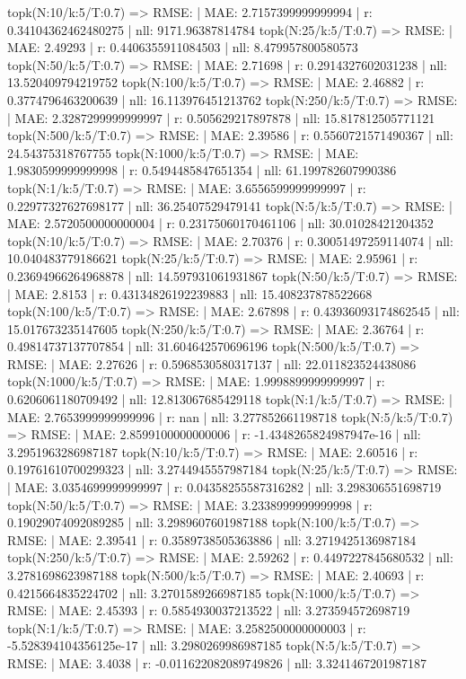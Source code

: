 topk(N:10/k:5/T:0.7) => RMSE: | MAE: 2.7157399999999994 | r: 0.34104362462480275 | nll: 9171.96387814784
topk(N:25/k:5/T:0.7) => RMSE: | MAE: 2.49293 | r: 0.4406355911084503 | nll: 8.479957800580573
topk(N:50/k:5/T:0.7) => RMSE: | MAE: 2.71698 | r: 0.2914327602031238 | nll: 13.520409794219752
topk(N:100/k:5/T:0.7) => RMSE: | MAE: 2.46882 | r: 0.3774796463200639 | nll: 16.113976451213762
topk(N:250/k:5/T:0.7) => RMSE: | MAE: 2.3287299999999997 | r: 0.505629217897878 | nll: 15.817812505771121
topk(N:500/k:5/T:0.7) => RMSE: | MAE: 2.39586 | r: 0.5560721571490367 | nll: 24.54375318767755
topk(N:1000/k:5/T:0.7) => RMSE: | MAE: 1.9830599999999998 | r: 0.5494485847651354 | nll: 61.199782607990386
topk(N:1/k:5/T:0.7) => RMSE: | MAE: 3.6556599999999997 | r: 0.22977327627698177 | nll: 36.25407529479141
topk(N:5/k:5/T:0.7) => RMSE: | MAE: 2.5720500000000004 | r: 0.23175060170461106 | nll: 30.01028421204352
topk(N:10/k:5/T:0.7) => RMSE: | MAE: 2.70376 | r: 0.30051497259114074 | nll: 10.040483779186621
topk(N:25/k:5/T:0.7) => RMSE: | MAE: 2.95961 | r: 0.23694966264968878 | nll: 14.597931061931867
topk(N:50/k:5/T:0.7) => RMSE: | MAE: 2.8153 | r: 0.43134826192239883 | nll: 15.408237878522668
topk(N:100/k:5/T:0.7) => RMSE: | MAE: 2.67898 | r: 0.43936093174862545 | nll: 15.017673235147605
topk(N:250/k:5/T:0.7) => RMSE: | MAE: 2.36764 | r: 0.49814737137707854 | nll: 31.604642570696196
topk(N:500/k:5/T:0.7) => RMSE: | MAE: 2.27626 | r: 0.5968530580317137 | nll: 22.011823524438086
topk(N:1000/k:5/T:0.7) => RMSE: | MAE: 1.9998899999999997 | r: 0.6206061180709492 | nll: 12.813067685429118
topk(N:1/k:5/T:0.7) => RMSE: | MAE: 2.7653999999999996 | r: nan | nll: 3.277852661198718
topk(N:5/k:5/T:0.7) => RMSE: | MAE: 2.8599100000000006 | r: -1.4348265824987947e-16 | nll: 3.2951963286987187
topk(N:10/k:5/T:0.7) => RMSE: | MAE: 2.60516 | r: 0.19761610700299323 | nll: 3.2744945557987184
topk(N:25/k:5/T:0.7) => RMSE: | MAE: 3.0354699999999997 | r: 0.04358255587316282 | nll: 3.298306551698719
topk(N:50/k:5/T:0.7) => RMSE: | MAE: 3.2338999999999998 | r: 0.19029074092089285 | nll: 3.2989607601987188
topk(N:100/k:5/T:0.7) => RMSE: | MAE: 2.39541 | r: 0.3589738505363886 | nll: 3.2719425136987184
topk(N:250/k:5/T:0.7) => RMSE: | MAE: 2.59262 | r: 0.4497227845680532 | nll: 3.2781698623987188
topk(N:500/k:5/T:0.7) => RMSE: | MAE: 2.40693 | r: 0.4215664835224702 | nll: 3.2701589266987185
topk(N:1000/k:5/T:0.7) => RMSE: | MAE: 2.45393 | r: 0.5854930037213522 | nll: 3.273594572698719
topk(N:1/k:5/T:0.7) => RMSE: | MAE: 3.2582500000000003 | r: -5.528394104356125e-17 | nll: 3.2980269986987185
topk(N:5/k:5/T:0.7) => RMSE: | MAE: 3.4038 | r: -0.011622082089749826 | nll: 3.3241467201987187
